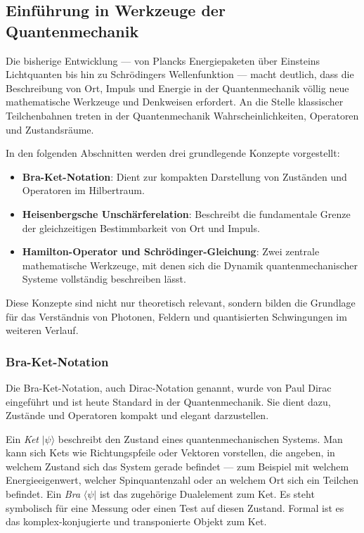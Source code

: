 \subsection{Einführung in Werkzeuge der Quantenmechanik\label{fourier:subsection:werkzeugeQuantenmechanik}}
	Die bisherige Entwicklung --- von Plancks Energiepaketen über Einsteins Lichtquanten bis hin zu Schrödingers Wellenfunktion ---
	macht deutlich, dass die Beschreibung von Ort, Impuls und Energie in der Quantenmechanik völlig neue mathematische Werkzeuge und Denkweisen erfordert.
	An die Stelle klassischer Teilchenbahnen treten in der Quantenmechanik Wahrscheinlichkeiten, Operatoren und Zustandsräume.

	In den folgenden Abschnitten werden drei grundlegende Konzepte vorgestellt:
	\begin{itemize}
	\item \textbf{Bra-Ket-Notation}:  
	Dient zur kompakten Darstellung von Zuständen und Operatoren im Hilbertraum.

	\item \textbf{Heisenbergsche Unschärferelation}:
	Beschreibt die fundamentale Grenze der gleichzeitigen Bestimmbarkeit von Ort und Impuls.

	\item \textbf{Hamilton-Operator und Schrödinger-Gleichung}:  
	Zwei zentrale mathematische Werkzeuge, mit denen sich die Dynamik quantenmechanischer Systeme vollständig beschreiben lässt.
	\end{itemize}

	Diese Konzepte sind nicht nur theoretisch relevant, sondern bilden die Grundlage für das Verständnis von Photonen, Feldern und quantisierten Schwingungen im weiteren Verlauf.

	\subsubsection{Bra-Ket-Notation\label{fourier:subsubsection:braKetNotation}}
		Die Bra-Ket-Notation, auch Dirac-Notation genannt, wurde von Paul Dirac eingeführt und ist heute Standard in der Quantenmechanik.
		Sie dient dazu, Zustände und Operatoren kompakt und elegant darzustellen.

		Ein \emph{Ket} $|\psi\rangle$ beschreibt den Zustand eines quantenmechanischen Systems.
		Man kann sich Kets wie Richtungspfeile oder Vektoren vorstellen, die angeben, in welchem Zustand sich das System gerade befindet ---
		zum Beispiel mit welchem Energieeigenwert, welcher Spinquantenzahl oder an welchem Ort sich ein Teilchen befindet.	Ein \emph{Bra} $\langle\psi|$ ist das zugehörige Dualelement zum Ket.
		Es steht symbolisch für eine Messung oder einen Test auf diesen Zustand.
		Formal ist es das komplex-konjugierte und transponierte Objekt zum Ket.

